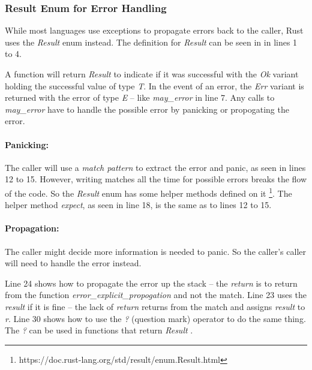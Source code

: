 \subsubsection{Result Enum for Error Handling}
\label{sec:result-enum}
While most languages use exceptions to propagate errors back to the caller, Rust uses the \textit{Result} enum instead.
The definition for \textit{Result} can be seen in  in lines 1 to 4.


A function will return \textit{Result} to indicate if it was successful with the \textit{Ok} variant holding the successful value of type \textit{T}.
In the event of an error, the \textit{Err} variant is returned with the error of type \textit{E} -- like \textit{may\_error} in line 7.
Any calls to \textit{may\_error} have to handle the possible error by panicking or propogating the error.

\paragraph{Panicking:}
The caller will use a \textit{match pattern} to extract the error and panic, as seen in lines 12 to 15.
However, writing matches all the time for possible errors breaks the flow of the code.
So the \textit{Result} enum has some helper methods defined on it \footnote{https://doc.rust-lang.org/std/result/enum.Result.html}.
The helper method \textit{expect}, as seen in line 18, is the same as to lines 12 to 15.

\paragraph{Propagation:}
The caller might decide more information is needed to panic.
So the caller's caller will need to handle the error instead.

Line 24 shows how to propagate the error up the stack -- the \textit{return} is to return from the function \textit{error\_explicit\_propogation} and not the match.
Line 23 uses the \textit{result} if it is fine -- the lack of \textit{return} returns from the match and assigns \textit{result} to \textit{r}.
Line 30 shows how to use the \textit{?} (question mark) operator to do the same thing.
The \textit{?} can be used in functions that return \textit{Result} \cite{klabnik_2019_01}.


